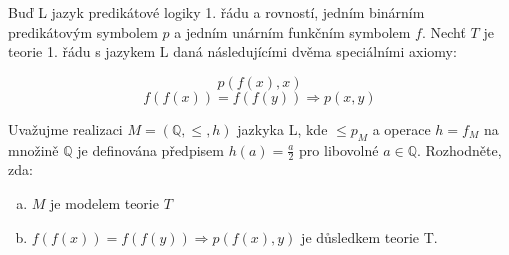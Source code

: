 Buď L jazyk predikátové logiky 1. řádu a rovností, jedním binárním predikátovým
symbolem $p$ a jedním unárním funkčním symbolem $f$.  Nechť $T$ je teorie 1.
řádu s jazykem L daná následujícími dvěma speciálními axiomy:

$$ p(f(x), x)$$
$$f(f(x)) = f(f(y)) \Rightarrow p(x,y)$$

Uvažujme realizaci $M=(\mathbb{Q}, \leq, h)$ jazkyka L, kde $\leq p_{M}$ a
operace $h=f_{M}$ na množině $\mathbb{Q}$ je definována předpisem $h(a) =
\frac{a}{2}$ pro libovolné $a \in \mathbb{Q}$. Rozhodněte, zda:

\begin{enumerate}[a)]
  \item $M$ je modelem teorie $T$
  \item $f(f(x)) = f(f(y)) \Rightarrow p(f(x), y)$ je důsledkem teorie T.
\end{enumerate}

